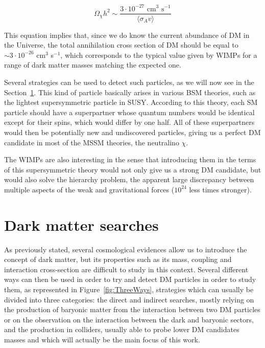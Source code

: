 \documentclass[a4paper, 10pt, openright]{report}
\begin{document}
\begin{equation}
\label{eq:Annihilation}
\Omega_\chi h^2 \sim \frac{3 \cdot 10^{-27} \text{ cm}^3 \text{ s}^{-1}}{\langle \sigma_A v \rangle}
\end{equation}

This equation implies that, since we do know the current abundance of \ac{DM} in the Universe, the total annihilation cross section of \ac{DM} should be equal to $\sim 3 \cdot 10^{-26} $ cm$^3 $ s$^{-1}$, which corresponds to the typical value given by \acp{WIMP} for a range of dark matter masses matching the expected one.

Several strategies can be used to detect such particles, as we will now see in the Section~\ref{section:DMSearches}. This kind of particle basically arises in various \ac{BSM} theories, such as the lightest supersymmetric particle in SUSY. According to this theory, each \ac{SM} particle should have a superpartner whose quantum numbers would be identical except for their spins, which would differ by one half. All of these superpartners would then be potentially new and undiscovered particles, giving us a perfect \ac{DM} candidate in most of the \ac{MSSM} theories, the neutralino $\chi$.

The \acp{WIMP} are also interesting in the sense that introducing them in the terms of this supersymmetric theory would not only give us a strong \ac{DM} candidate, but would also solve the hierarchy problem, the apparent large discrepancy between multiple aspects of the weak and gravitational forces ($10^{24}$ less times stronger).

\section{Dark matter searches} \label{section:DMSearches}

As previously stated, several cosmological evidences allow us to introduce the concept of dark matter, but its properties such as its mass, coupling and interaction cross-section are difficult to study in this context. Several different ways can then be used in order to try and detect \ac{DM} particles in order to study them, as represented in Figure~\ref{fig:ThreeWays}, strategies which can usually be divided into three categories: the direct and indirect searches, mostly relying on the production of baryonic matter from the interaction between two \ac{DM} particles or on the observation on the interaction between the dark and baryonic sectors, and the production in colliders, usually able to probe lower \ac{DM} candidates masses and which will actually be the main focus of this work. 
\end{document}
